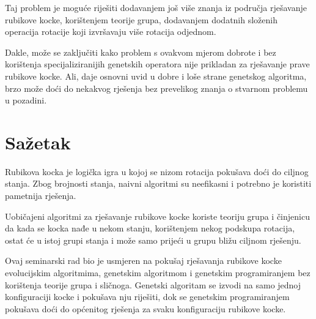 \documentclass[times, utf8, seminar, numeric]{fer}
\begin{document}
Taj problem je moguće riješiti dodavanjem još više znanja iz područja rješavanje rubikove kocke, korištenjem teorije grupa, dodavanjem dodatnih složenih operacija rotacije koji izvršavaju više rotacija odjednom. 

Dakle, može se zaključiti kako problem s ovakvom mjerom dobrote i bez korištenja specijaliziranijih genetskih operatora nije prikladan za rješavanje prave rubikove kocke. Ali, daje osnovni uvid u dobre i loše strane genetskog algoritma, brzo može doći do nekakvog rješenja bez prevelikog znanja o stvarnom problemu u pozadini.





\chapter{Sažetak}
Rubikova kocka je logička igra u kojoj se nizom rotacija pokušava doći do ciljnog stanja. Zbog brojnosti stanja, naivni algoritmi su neefikasni i potrebno je koristiti pametnija rješenja.

Uobičajeni algoritmi za rješavanje rubikove kocke koriste teoriju grupa i činjenicu da kada se kocka nađe u nekom stanju, korištenjem nekog podskupa rotacija, ostat će u istoj grupi stanja i može samo prijeći u grupu bližu ciljnom rješenju.

Ovaj seminarski rad bio je usmjeren na pokušaj rješavanja rubikove kocke evolucijskim algoritmima, genetskim algoritmom i genetskim programiranjem bez korištenja teorije grupa i sličnoga. Genetski algoritam se izvodi na samo jednoj konfiguraciji kocke i pokušava nju riješiti, dok se genetskim programiranjem pokušava doći do općenitog rješenja za svaku konfiguraciju rubikove kocke.

 
\end{document}
